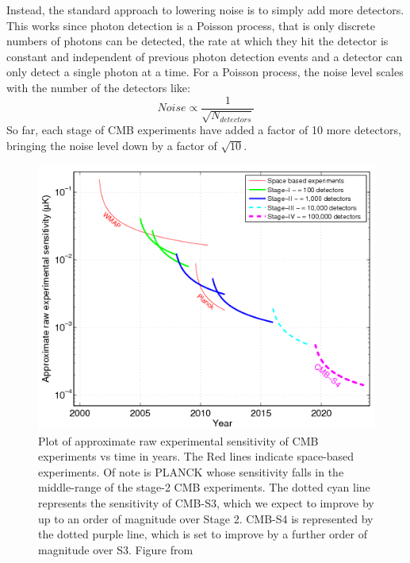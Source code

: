 Instead, the standard approach to lowering noise is to simply add more detectors. This works since photon detection is a Poisson process, that is only discrete numbers of photons can be detected, the rate at which they hit the detector is constant and independent of previous photon detection events and a detector can only detect a single photon at a time. For a Poisson process, the noise level scales with the number of the detectors like: $$ Noise \propto \frac{1}{\sqrt{N_{detectors}}}$$ So far, each stage of CMB experiments have added a factor of 10 more detectors, bringing the noise level down by a factor of $\sqrt{10}$.

\begin{figure}[t]
\centering
\includegraphics[scale=0.75]{images/experiments.png} 
\caption{Plot of approximate raw experimental sensitivity of CMB experiments vs time in years. The Red lines indicate space-based experiments. Of note is PLANCK whose sensitivity falls in the middle-range of the stage-2 CMB experiments. The dotted cyan line represents the sensitivity of CMB-S3, which we expect to improve by up to an order of magnitude over Stage 2. CMB-S4 is represented by the dotted purple line, which is set to improve by a further order of magnitude over S3. Figure from \citet{Abazajian:2013oma}}
\end{figure}

